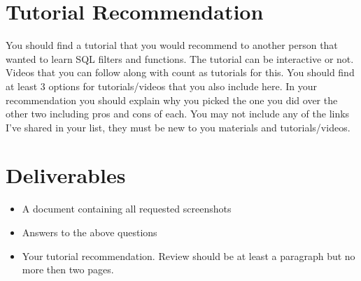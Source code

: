 \documentclass[12pt]{article}
\begin{document}
    \section*{Tutorial Recommendation}
You should find a tutorial that you would recommend to another person that wanted to learn SQL filters and functions.  The tutorial can be interactive or not.  Videos that you can follow along with count as tutorials for this. You should find at least 3 options for tutorials/videos that you also include here. In your recommendation you should explain why you picked the one you did over the other two including pros and cons of each. You may not include any of the links I've shared in your list, they must be new to you materials and tutorials/videos. 


\section*{Deliverables}
\begin{itemize}
    \item A document containing all requested screenshots
    \item Answers to the above questions
    \item Your tutorial recommendation.  Review should be at least a paragraph but no more then two pages. 
\end{itemize} 
\end{document}
